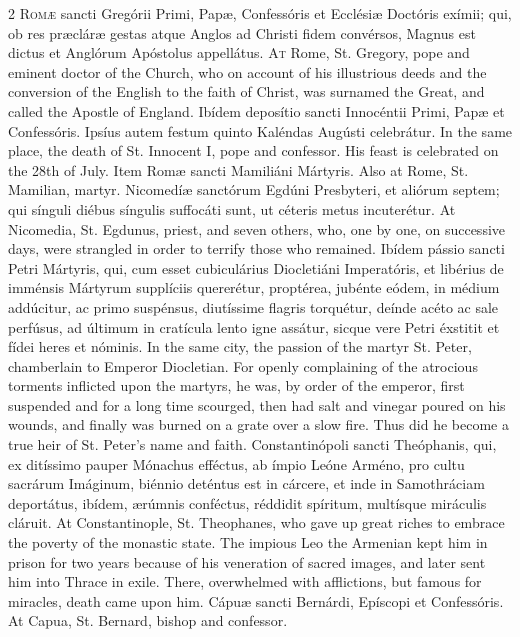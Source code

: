 \begin{paracol}{2}
\lettrine[lines=2]{R}{omæ} sancti Gregórii Primi, Papæ, Confessóris 
 et Ecclésiæ Doctóris exímii; qui, ob res præcláræ gestas atque Anglos ad 
 Christi fidem convérsos, Magnus est dictus et Anglórum Apóstolus appellátus.
\switchcolumn
{}
\lettrine[lines=2]{A}{t} Rome, St. Gregory, pope and eminent doctor of the Church, who on account 
 of his illustrious deeds and the conversion of the English to the faith of 
 Christ, was surnamed the Great, and called the Apostle of England.
\switchcolumn*
{}
Ibídem deposítio sancti Innocéntii Primi, Papæ 
 et Confessóris. Ipsíus autem festum quinto Kaléndas Augústi celebrátur.
\switchcolumn
{}
In the same place, the death of St. Innocent I, pope and confessor. 
 His feast is celebrated on the 28th of July.
\switchcolumn*
{}
Item Romæ sancti Mamiliáni Mártyris.
\switchcolumn
{}
Also at Rome, St. Mamilian, martyr.
\switchcolumn*
{}
Nicomedíæ sanctórum Egdúni Presbyteri, et 
 aliórum septem; qui sínguli diébus síngulis suffocáti sunt, ut céteris metus 
 incuterétur.
\switchcolumn
{}
At Nicomedia, St. Egdunus, priest, and seven others, who, one by one, on 
 successive days, were strangled in order to terrify those who remained.
\switchcolumn*
{}
Ibídem pássio sancti Petri Mártyris, qui, cum esset cubiculárius Diocletiáni 
 Imperatóris, et libérius de imménsis Mártyrum supplíciis quererétur, 
 proptérea, jubénte eódem, in médium addúcitur, ac primo suspénsus, 
 diutíssime flagris torquétur, deínde acéto ac sale perfúsus, ad últimum in 
 cratícula lento igne assátur, sicque vere Petri éxstitit et fídei heres et 
 nóminis.
\switchcolumn
{}
In the same city, the passion of the martyr St. Peter, chamberlain to 
 Emperor Diocletian. For openly complaining of the atrocious torments 
 inflicted upon the martyrs, he was, by order of the emperor, first suspended 
 and for a long time scourged, then had salt and vinegar poured on his 
 wounds, and finally was burned on a grate over a slow fire. Thus did 
 he become a true heir of St. Peter's name and faith.
\switchcolumn*
{}
Constantinópoli sancti Theóphanis, qui, ex ditíssimo pauper Mónachus 
 efféctus, ab ímpio Leóne Arméno, pro cultu sacrárum Imáginum, biénnio 
 deténtus est in cárcere, et inde in Samothráciam deportátus, ibídem,
 ærúmnis conféctus, réddidit spíritum, multísque 
 miráculis cláruit.
\switchcolumn
{}
At Constantinople, St. Theophanes, who gave up great riches to embrace the 
 poverty of the monastic state. The impious Leo the Armenian kept him 
 in prison for two years because of his veneration of sacred images, and 
 later sent him into Thrace in exile. There, overwhelmed with 
 afflictions, but famous for miracles, death came upon him.
\switchcolumn*
{}
Cápuæ sancti Bernárdi, Epíscopi et Confessóris.
\switchcolumn
{}
At Capua, St. Bernard, bishop and confessor.
\switchcolumn*
{}
\end{paracol}


